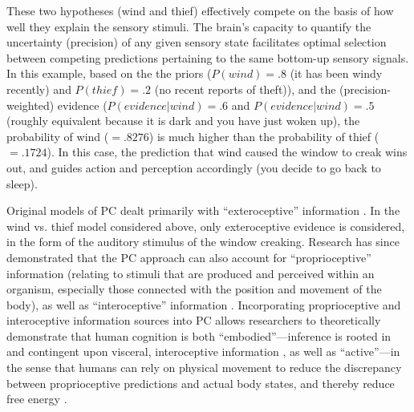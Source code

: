 \begin{CJK}{UTF8}{gbsn}
These two hypotheses (wind and thief) effectively compete on the basis of how well they explain the sensory stimuli.  The brain's capacity to quantify the uncertainty (precision) of any given sensory state facilitates optimal selection between competing predictions pertaining to the same bottom-up sensory signals.  In this example, based on the the priors ($P(wind) = .8$ (it has been windy recently) and $P(thief) = .2$ (no recent reports of theft)), and the (precision-weighted) evidence ($P(evidence|wind) = .6$ and $P(evidence|wind) = .5$ (roughly equivalent because it is dark and you have just woken up), the probability of wind ($= .8276$) is much higher than the probability of thief ($= .1724$).  In this case, the prediction that wind caused the window to creak wins out, and guides action and perception accordingly (you decide to go back to sleep).


Original models of PC dealt primarily with ``exteroceptive'' information \citep[relating to stimuli that are external to an organism, i.e. visual, auditory, haptic perception][]{Rao1999,Friston2010}.  In the wind vs. thief model considered above, only exteroceptive evidence is considered, in the form of the auditory stimulus of the window creaking.  Research has since demonstrated that the PC approach can also account for ``proprioceptive'' information (relating to stimuli that are produced and perceived within an organism, especially those connected with the position and movement of the body), as well as ``interoceptive'' information  \citep[relating to stimuli produced within an organism, particularly by the body's organs (viscera) e.g., ``gut feelings,'' or elevated heart rate; see][]{Seth2013,FeldmanBarrett2015}.  Incorporating proprioceptive and interoceptive information sources into PC allows researchers to theoretically demonstrate that human cognition is both ``embodied''---inference is rooted in and contingent upon visceral, interoceptive information \citep[][]{Pezzulo2014}, as well as ``active''---in the sense that humans can rely on physical movement to reduce the discrepancy between proprioceptive predictions and actual body states, and thereby reduce free energy \citep[see][]{Friston2010,Clark2015}.


\end{CJK}

